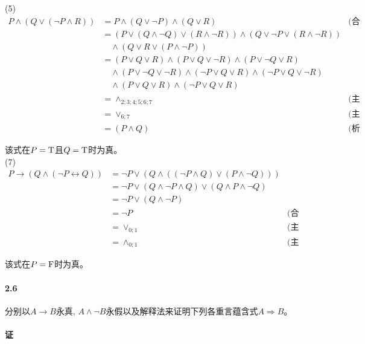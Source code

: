 \documentclass[hyperref, UTF8]{ctexart}
\newcommand{\true}{{\rm T}}
\newcommand{\false}{{\rm F}}
\begin{document}
(5)
\begin{align*}
P \land (Q \lor ( \lnot P \land R))
    &= P \land (Q \lor \lnot P) \land (Q \lor R) & \text{(合取范式)} \\
    &= (P \lor (Q \land \lnot Q) \lor (R \land \lnot R)) \land (Q \lor \lnot P \lor (R \land \lnot R)) \\
    & \quad \land (Q \lor R \lor (P \land \lnot P)) \\
    &= (P \lor Q \lor R) \land (P \lor Q \lor \lnot R) \land (P \lor \lnot Q \lor R) \\
    & \quad \land (P \lor \lnot Q \lor \lnot R) \land ( \lnot P \lor Q \lor R) \land ( \lnot P \lor Q \lor \lnot R) \\
    & \quad \land (P \lor Q \lor R) \land ( \lnot P \lor Q \lor R) \\
    &= \land _{2;3;4;5;6;7} & \text{(主合取范式)}\\
    &= \lor _{6;7} & \text{(主析取范式)}\\
    &= (P \land Q) & \text{(析取范式)}
\end{align*}

该式在$P=\true$且$Q=\true$时为真。\\

(7)
\begin{align*}
P \rightarrow (Q \land ( \lnot P \leftrightarrow Q))
    &= \lnot P \lor (Q \land (( \lnot P \land Q) \lor (P \land \lnot Q))) \\
    &= \lnot P \lor (Q \land \lnot P \land Q) \lor (Q \land P \land \lnot Q) \\
    &= \lnot P \lor (Q \land \lnot P) \\
    &= \lnot P & \text{(合取范式、析取范式)} \\
    &= \lor _{0;1} & \text{(主析取范式)} \\
    &= \land _{0;1} & \text{(主合取范式)}
\end{align*}

该式在$P=\false$时为真。\\

\paragraph{2.6}\label{2.6}
分别以$A \to B$永真, $A\land \lnot B$永假以及解释法来证明下列各重言蕴含式$A\Rightarrow B$。\\

\paragraph{证}
\end{document}

